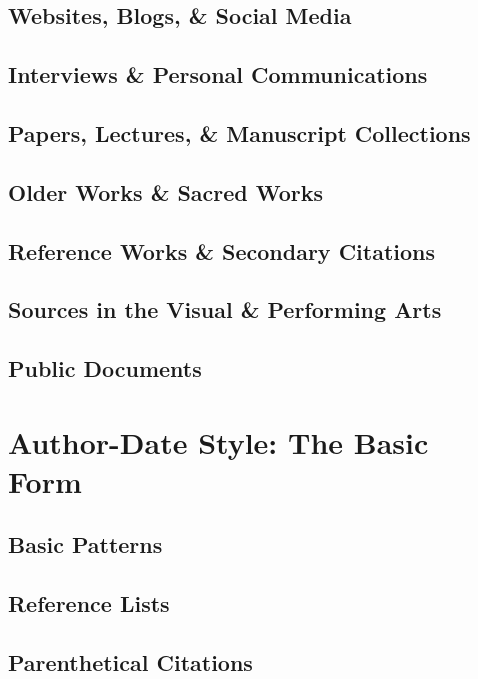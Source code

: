 \documentclass[oneside]{book}
\numberwithin{equation}{section}
\begin{document}
\section{Websites, Blogs, \& Social Media}

\section{Interviews \& Personal Communications}

\section{Papers, Lectures, \& Manuscript Collections}

\section{Older Works \& Sacred Works}

\section{Reference Works \& Secondary Citations}

\section{Sources in the Visual \& Performing Arts}

\section{Public Documents}


\chapter{Author-Date Style: The Basic Form}

\section{Basic Patterns}

\section{Reference Lists}

\section{Parenthetical Citations}
\end{document}
